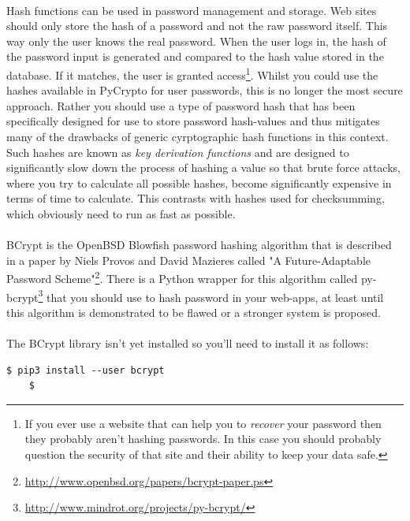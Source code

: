 \documentclass[12pt, a4paper, oneside]{book}
\begin{document}
\paragraph{} Hash functions can be used in password management and storage. Web sites should only store the hash of a password and not the raw password itself. This way only the user knows the real password. When the user logs in, the hash of the password input is generated and compared to the hash value stored in the database. If it matches, the user is granted access\footnote{If you ever use a website that can help you to \emph{recover} your password then they probably aren't hashing passwords. In this case you should probably question the security of that site and their ability to keep your data safe.}. Whilst you could use the hashes available in PyCrypto for user passwords, this is no longer the most secure approach. Rather you should use a type of password hash that has been specifically designed for use to store password hash-values and thus mitigates many of the drawbacks of generic cyrptographic hash functions in this context. Such hashes are known as \emph{key derivation functions} and are designed to significantly slow down the process of hashing a value so that brute force attacks, where you try to calculate all possible hashes, become significantly expensive in terms of time to calculate. This contrasts with hashes used for checksumming, which obviously need to run as fast as possible. 

\paragraph{} BCrypt is the OpenBSD Blowfish password hashing algorithm that is described in a paper by Niels Provos and David Mazieres called "A Future-Adaptable Password Scheme"\footnote{\url{http://www.openbsd.org/papers/bcrypt-paper.ps}}. There is a Python wrapper for this algorithm called py-bcrypt\footnote{\url{http://www.mindrot.org/projects/py-bcrypt/}} that you should use to hash password in your web-apps, at least until this algorithm is demonstrated to be flawed or a stronger system is proposed.

\paragraph{} The BCrypt library isn't yet installed so you'll need to install it as follows:

\begin{lstlisting}[style=DOS]
    $ pip3 install --user bcrypt
    $
\end{lstlisting}
\end{document}

